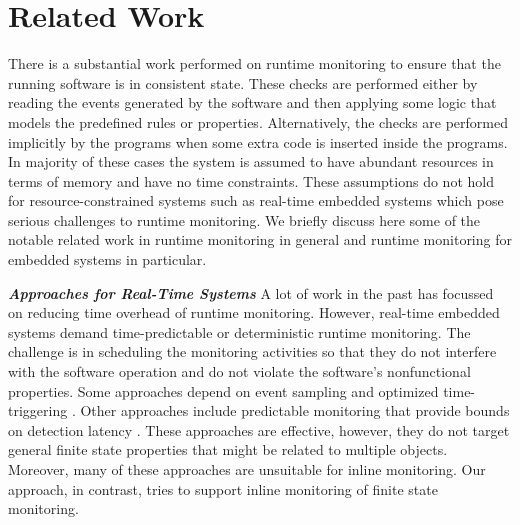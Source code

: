 \section{Related Work}

There is a substantial work performed on runtime monitoring to ensure that the running software is in consistent state. These checks are performed either by reading the events generated by the software and then applying some logic that models the predefined rules or properties. Alternatively, the checks are performed implicitly by the programs when some extra code is inserted inside the programs. In majority of these cases the system is assumed to have abundant resources in terms of memory and have no time constraints. These assumptions do not hold for resource-constrained systems such as real-time embedded systems which pose serious challenges to runtime monitoring. We briefly discuss here some of the notable related work in runtime monitoring in general and runtime monitoring for embedded systems in particular.

\textbf{\textit {Approaches for Real-Time Systems}} A lot of work in the past has focussed on reducing time overhead of runtime monitoring. However, real-time embedded systems demand time-predictable or deterministic runtime monitoring. The challenge is in scheduling the monitoring activities so that they do not interfere with the software operation and do not violate the software's nonfunctional properties. Some approaches depend on event sampling and optimized time-triggering \cite{ArafaKF13, NavabpourBF12, WuKBF13}. Other approaches include predictable monitoring that provide bounds on detection latency \cite{ZhuDG09, ZhuGD10}. These approaches are effective, however, they do not target general finite state properties that might be related to multiple objects. Moreover, many of these approaches are unsuitable for inline monitoring. Our approach, in contrast, tries to support inline monitoring of finite state monitoring.

